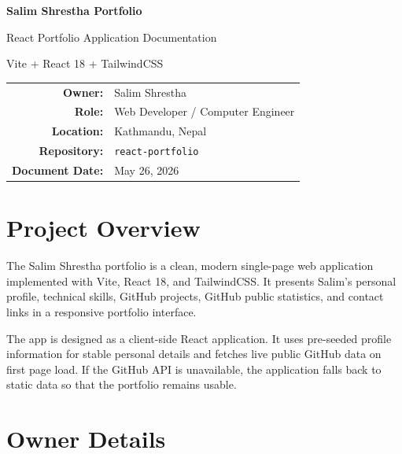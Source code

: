 \documentclass[12pt,a4paper]{article}
\begin{document}
\begin{titlepage}
  \centering
  \vspace*{2cm}
  {\Huge\bfseries Salim Shrestha Portfolio\par}
  \vspace{0.6cm}
  {\Large React Portfolio Application Documentation\par}
  \vspace{1.2cm}
  {\large Vite + React 18 + TailwindCSS\par}
  \vfill
  \begin{tabular}{>{\bfseries}rl}
    Owner: & Salim Shrestha \\
    Role: & Web Developer / Computer Engineer \\
    Location: & Kathmandu, Nepal \\
    Repository: & \texttt{react-portfolio} \\
    Document Date: & May 26, 2026 \\
  \end{tabular}
  \vfill
\end{titlepage}

\tableofcontents
\newpage

\section{Project Overview}

The Salim Shrestha portfolio is a clean, modern single-page web application
implemented with Vite, React 18, and TailwindCSS. It presents Salim's personal
profile, technical skills, GitHub projects, GitHub public statistics, and
contact links in a responsive portfolio interface.

The app is designed as a client-side React application. It uses pre-seeded
profile information for stable personal details and fetches live public GitHub
data on first page load. If the GitHub API is unavailable, the application
falls back to static data so that the portfolio remains usable.

\section{Owner Details}
\end{document}
